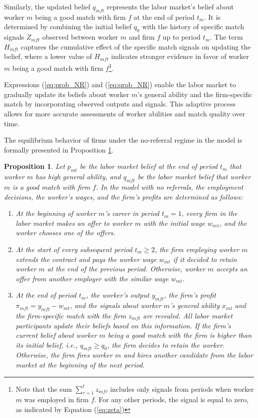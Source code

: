 \documentclass[12pt]{article}
\newtheorem{proposition}{Proposition}
\begin{document}
Similarly, the updated belief $q_{mft}$ represents the labor market's belief about worker $m$ being a good match with firm $f$ at the end of period $t_m$. It is determined by combining the initial belief $q_0$ with the history of specific match signals $Z_{mft}$ observed between worker $m$ and firm $f$ up to period $t_m$. The term $H_{mft}$ captures the cumulative effect of the specific match signals on updating the belief, where a lower value of $H_{mft}$ indicates stronger evidence in favor of worker $m$ being a good match with firm $f$\footnote{Note that the sum $\sum_{\tau = 1}^t z_{mf\tau}$ includes only signals from periods when worker $m$ was employed in firm $f$. For any other periods, the signal is equal to zero, as indicated by Equation (\ref{eq:zeta})}. 

Expressions (\ref{eq:prob_NR}) and (\ref{eq:qrob_NR}) enable the labor market to gradually update its beliefs about worker $m$'s general ability and the firm-specific match by incorporating observed outputs and signals. This adaptive process allows for more accurate assessments of worker abilities and match quality over time.

The equilibrium behavior of firms under the no-referral regime in the model is formally presented in Proposition \ref{prop:equil_no_referrals}.

\begin{proposition}\label{prop:equil_no_referrals}
Let $p_{mt}$ be the labor market belief at the end of period $t_m$ that worker $m$ has high general ability, and $q_{mft}$ be the labor market belief that worker $m$ is a good match with firm $f$. In the model with no referrals, the employment decisions, the worker's wages, and the firm's profits are determined as follows:
    \begin{enumerate}[label={\roman*})]
        \item At the beginning of worker $m$'s career in period $t_m = 1$, every firm in the labor market makes an offer to worker $m$ with the initial wage $w_{m1}$, and the worker chooses one of the offers.
        \item At the start of every subsequent period $t_m \geq 2$, the firm employing worker $m$ extends the contract and pays the worker wage $w_{mt}$ if it decided to retain worker $m$ at the end of the previous period. Otherwise, worker $m$ accepts an offer from another employer with the similar wage $w_{mt}$.
        \item At the end of period $t_m$, the worker's output $y_{mft}$, the firm's profit $\pi_{mft} = y_{mft} - w_{mt}$, and the signals about worker $m$'s general ability $x_{mt}$ and the firm-specific match with the firm $z_{mft}$ are revealed. All labor market participants update their beliefs based on this information. If the firm's current belief about worker $m$ being a good match with the firm is higher than its initial belief, i.e., $q_{mft}\geq q_0$, the firm decides to retain the worker. Otherwise, the firm fires worker $m$ and hires another candidate from the labor market at the beginning of the next period.
    \end{enumerate}
\end{proposition}
\end{document}
